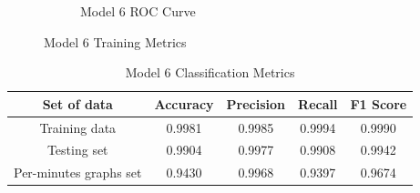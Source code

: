 \begin{figure}[H]
\begin{subfigure}{0.49\textwidth}
        \caption{Model 6 ROC Curve}
    \label{fig:do_2_auc}
    \end{subfigure}
    \captionsetup{font=large}
\caption{Model 6 Training Metrics}
 \label{fig:6_tr}
\end{figure}

\begin{table}[H]%
\centering
\begin{tabular}{|c|c|c|c|c|}
\hline
Set of data & Accuracy & Precision & Recall & F1 Score \\
\hline
Training data  & 0.9981 & 0.9985 & 0.9994 & 0.9990 \\
\hline
Testing set & 0.9904 & 0.9977 & 0.9908 & 0.9942 \\
\hline
Per-minutes graphs set & 0.9430 & 0.9968 & 0.9397 & 0.9674 \\
\hline
\end{tabular}
\caption{Model 6 Classification Metrics}
\label{M6_tab}
\end{table}
